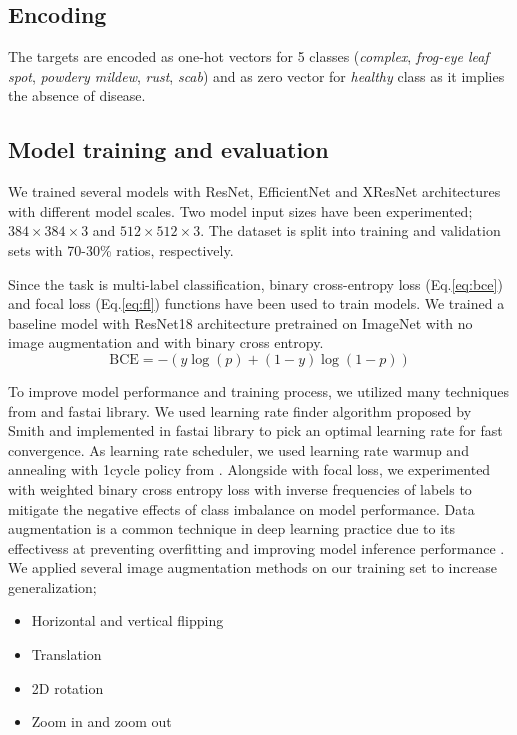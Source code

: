 \documentclass[conference]{IEEEtran}
\begin{document}
\subsection{Encoding}
The targets are encoded as one-hot vectors for 5 classes 
(\textit{complex}, \textit{frog-eye leaf spot}, \textit{powdery mildew}, 
\textit{rust}, \textit{scab}) and 
as zero vector for \textit{healthy} class as it implies the absence of disease.

\subsection{Model training and evaluation}
We trained several models with ResNet, EfficientNet and XResNet architectures 
with different model scales. Two model input sizes have been experimented; 
$384 \times 384 \times 3$ and $512 \times 512 \times 3$. 
The dataset is split into training and validation sets with 70-30\% ratios, respectively.

Since the task is multi-label classification, binary cross-entropy loss (Eq.\ref{eq:bce})
and focal loss (Eq.\ref{eq:fl}) functions have been used to train models. 
We trained a baseline model with ResNet18 architecture pretrained on ImageNet 
with no image augmentation and with binary cross entropy. 
\begin{equation*}
    \text{BCE} = -{(y\log(p) + (1 - y)\log(1 - p))} \label{eq:bce}
\end{equation*}

To improve model performance and training process, 
we utilized many techniques from \cite{BagOfTricks} and fastai \cite{fastai} library.
We used learning rate finder algorithm proposed by Smith \cite{Smith2015}
and implemented in fastai library to pick an optimal learning rate for fast convergence.
As learning rate scheduler, we used learning rate warmup and annealing \cite{BagOfTricks}
with 1cycle policy from \cite{Smith2018}. Alongside with focal loss, 
we experimented with weighted binary cross entropy loss with inverse 
frequencies of labels to mitigate the negative effects of class imbalance 
on model performance. 
Data augmentation is a common technique in deep learning practice due to its 
effectivess at preventing overfitting and improving model inference performance \cite{Shorten2019}.
We applied several image augmentation methods on our training set 
to increase generalization;
\begin{itemize}
    \item Horizontal and vertical flipping
    \item Translation
    \item 2D rotation
    \item Zoom in and zoom out
\end{itemize}
\end{document}
